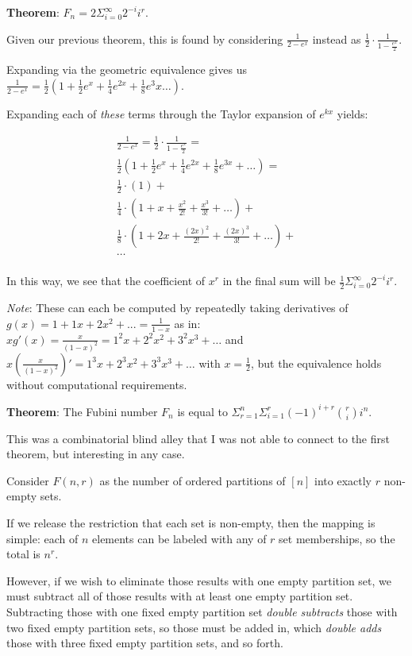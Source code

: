 \documentclass[11pt, oneside]{article} 	%
\begin{document}
\textbf{Theorem}: $F_n = 2 \Sigma_{i=0}^{\infty} 2^{-i} i^r$.

Given our previous theorem, this is found by considering $\frac{1}{2-e^x}$ instead as $\frac{1}{2} \cdot \frac{1}{1 - \frac{e^x}{2}}$.

Expanding via the geometric equivalence gives us $\frac{1}{2-e^x} =  \frac{1}{2}(1 + \frac{1}{2}e^x + \frac{1}{4}e^{2x} + \frac{1}{8}e^3x\dots)$. 

Expanding each of \textit{these} terms through the Taylor expansion of $e^{kx}$ yields:

\begin{align}
\frac{1}{2-e^x}  = \frac{1}{2} \cdot \frac{1}{1 - \frac{e^x}{2}} = \\
\frac{1}{2}(1 + \frac{1}{2}e^x + \frac{1}{4}e^{2x} + \frac{1}{8}e^{3x} + \dots ) = \\
\frac{1}{2} \cdot (1) + \\ 
\frac{1}{4} \cdot (1 + x + \frac{x^2}{2!} + \frac{x^3}{3!} + \dots ) + \\
\frac{1}{8} \cdot (1 + 2x + \frac{(2x)^2}{2!} + \frac{(2x)^3}{3!} + \dots ) +\\
\dots \\
\end{align}

In this way, we see that the coefficient of $x^r$ in the final sum will be $\frac{1}{2}\Sigma_{i=0}^{\infty} 2^{-i}i^r$.

\textit{Note}: These can each be computed by repeatedly taking derivatives of $g(x) = 1+1x+2x^2+... = \frac{1}{1-x}$ as in:
$xg'(x) = \frac{x}{(1-x)^2} = 1^2 x + 2^2 x^2 + 3^2 x^3 + \dots$ and $x(\frac{x}{(1-x)^2})' =   1^3 x + 2^3 x^2 + 3^3 x^3 + \dots$ with $x=  \frac{1}{2}$, but the equivalence holds without computational requirements.

\textbf{Theorem}: The Fubini number $F_n$ is equal to $\Sigma_{r=1}^n\Sigma_{i=1}^r (-1)^{i+r}\binom{r}{i}{i^n}$.

This was a combinatorial blind alley that I was not able to connect to the first theorem, but interesting in any case.

Consider $F(n, r)$ as the number of ordered partitions of $[n]$ into exactly $r$ non-empty sets.  

If we release the restriction that each set is non-empty, then the mapping is simple: each of $n$ elements can be labeled with any of $r$ set memberships, so the total is $n^r$.

However, if we wish to eliminate those results with one empty partition set, we must subtract all of those results with at least one empty partition set.  Subtracting those with one fixed empty partition set \textit{double subtracts} those with two fixed empty partition sets, so those must be added in, which \textit{double adds} those with three fixed empty partition sets, and so forth.
\end{document}
